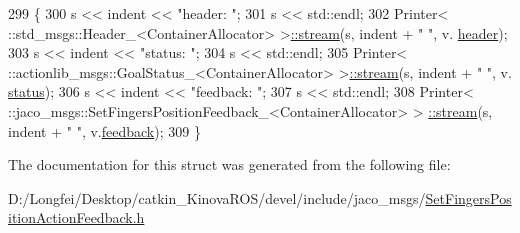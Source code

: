 \begin{DoxyCode}
299   \{
300     s << indent << \textcolor{stringliteral}{"header: "};
301     s << std::endl;
302     Printer< ::std\_msgs::Header\_<ContainerAllocator> >\hyperlink{structros_1_1message__operations_1_1Printer_3_01_1_1jaco__msgs_1_1SetFingersPositionActionFeedbae13e05216e53f9116f074ec65036b29d_a96850af8444a36a39e34d1da71d282e2}{::stream}(s, indent + \textcolor{stringliteral}{"  "}, v.
      \hyperlink{structjaco__msgs_1_1SetFingersPositionActionFeedback___a19ad5326591e67e1b587b9dd4feaf43a}{header});
303     s << indent << \textcolor{stringliteral}{"status: "};
304     s << std::endl;
305     Printer< ::actionlib\_msgs::GoalStatus\_<ContainerAllocator> >\hyperlink{structros_1_1message__operations_1_1Printer_3_01_1_1jaco__msgs_1_1SetFingersPositionActionFeedbae13e05216e53f9116f074ec65036b29d_a96850af8444a36a39e34d1da71d282e2}{::stream}(s, indent + \textcolor{stringliteral}{"  "}, v.
      \hyperlink{structjaco__msgs_1_1SetFingersPositionActionFeedback___a71d3e9d0ba73d2d1db190090ddbdf943}{status});
306     s << indent << \textcolor{stringliteral}{"feedback: "};
307     s << std::endl;
308     Printer< ::jaco\_msgs::SetFingersPositionFeedback\_<ContainerAllocator> >
      \hyperlink{structros_1_1message__operations_1_1Printer_3_01_1_1jaco__msgs_1_1SetFingersPositionActionFeedbae13e05216e53f9116f074ec65036b29d_a96850af8444a36a39e34d1da71d282e2}{::stream}(s, indent + \textcolor{stringliteral}{"  "}, v.\hyperlink{structjaco__msgs_1_1SetFingersPositionActionFeedback___a4c94007aeb334a1eaa98104b7a8cb86c}{feedback});
309   \}
\end{DoxyCode}


The documentation for this struct was generated from the following file\+:\begin{DoxyCompactItemize}
\item 
D\+:/\+Longfei/\+Desktop/catkin\+\_\+\+Kinova\+R\+O\+S/devel/include/jaco\+\_\+msgs/\hyperlink{SetFingersPositionActionFeedback_8h}{Set\+Fingers\+Position\+Action\+Feedback.\+h}\end{DoxyCompactItemize}
